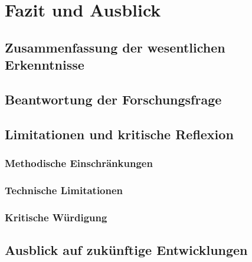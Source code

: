\chapter{Fazit und Ausblick}
\label{sec:FazitAusblick}

\section{Zusammenfassung der wesentlichen Erkenntnisse}

\section{Beantwortung der Forschungsfrage}

\section{Limitationen und kritische Reflexion}

\subsection{Methodische Einschränkungen}

\subsection{Technische Limitationen}

\subsection{Kritische Würdigung}

\section{Ausblick auf zukünftige Entwicklungen}

